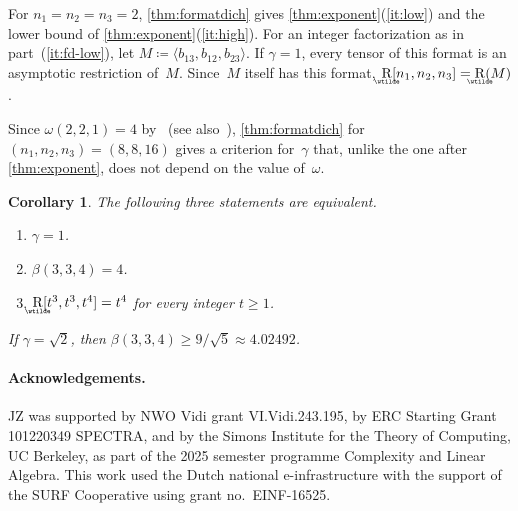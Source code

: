 \documentclass[11pt,letterpaper]{article}
\numberwithin{equation}{section}
\newtheorem{corollary}[theorem]{Corollary}
\theoremstyle{definition}
\DeclareMathOperator{\asymprank}{\underaccent{\wtilde}{R}}
\begin{document}
For $n_1=n_2=n_3=2$, \cref{thm:formatdich} gives \cref{thm:exponent}(\ref{it:low}) and the lower bound of
\cref{thm:exponent}(\ref{it:high}). For an integer factorization as in part~(\ref{it:fd-low}), let
$M\coloneqq\langle b_{13},b_{12},b_{23}\rangle$. If $\gamma=1$, every tensor of this format is an asymptotic restriction
of~$M$. Since~$M$ itself has this format, $\asymprank[n_1,n_2,n_3]=\asymprank(M)$.

Since $\omega(2,2,1)=4$ by~\cite[Theorem~1.1]{uznanski2026rectangularmatrixmultiplicationpolynomial} (see also~\cite[Theorem~1.2]{amanov2026multiplyingmatricespolynomialsexposition}),
\cref{thm:formatdich} for $(n_1,n_2,n_3)=(8,8,16)$ gives a criterion for~$\gamma$ that, unlike the one after
\cref{thm:exponent}, does not depend on the value of~$\omega$.

\begin{corollary}\label{cor:334}
The following three statements are equivalent.
\begin{enumerate}[\upshape(i)]
\item\label{it:334-gamma} $\gamma=1$.
\item\label{it:334-beta} $\beta(3,3,4)=4$.
\item\label{it:334-rank} $\asymprank[t^3,t^3,t^4]=t^4$ for every integer $t\ge1$.
\end{enumerate}
If $\gamma=\sqrt2$, then $\beta(3,3,4)\ge9/\sqrt5\approx4.02492$.
\end{corollary}

\paragraph{Acknowledgements.} JZ was supported by NWO Vidi grant VI.Vidi.243.195, by ERC Starting Grant 101220349 SPECTRA, and by the Simons Institute for the Theory of Computing, UC Berkeley, as part of the 2025 semester programme Complexity and Linear Algebra. This work used the Dutch national e-infrastructure with the support of the SURF Cooperative using grant no.~EINF-16525.



\end{document}
